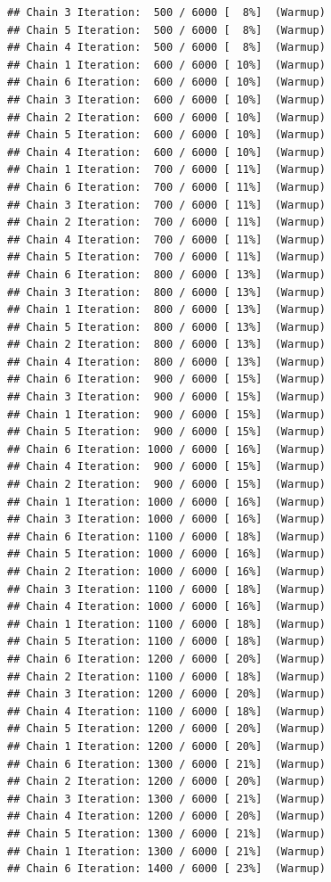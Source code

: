 \documentclass[
]{article}
\begin{document}
\begin{verbatim}
## Chain 3 Iteration:  500 / 6000 [  8%]  (Warmup) 
## Chain 5 Iteration:  500 / 6000 [  8%]  (Warmup) 
## Chain 4 Iteration:  500 / 6000 [  8%]  (Warmup) 
## Chain 1 Iteration:  600 / 6000 [ 10%]  (Warmup) 
## Chain 6 Iteration:  600 / 6000 [ 10%]  (Warmup) 
## Chain 3 Iteration:  600 / 6000 [ 10%]  (Warmup) 
## Chain 2 Iteration:  600 / 6000 [ 10%]  (Warmup) 
## Chain 5 Iteration:  600 / 6000 [ 10%]  (Warmup) 
## Chain 4 Iteration:  600 / 6000 [ 10%]  (Warmup) 
## Chain 1 Iteration:  700 / 6000 [ 11%]  (Warmup) 
## Chain 6 Iteration:  700 / 6000 [ 11%]  (Warmup) 
## Chain 3 Iteration:  700 / 6000 [ 11%]  (Warmup) 
## Chain 2 Iteration:  700 / 6000 [ 11%]  (Warmup) 
## Chain 4 Iteration:  700 / 6000 [ 11%]  (Warmup) 
## Chain 5 Iteration:  700 / 6000 [ 11%]  (Warmup) 
## Chain 6 Iteration:  800 / 6000 [ 13%]  (Warmup) 
## Chain 3 Iteration:  800 / 6000 [ 13%]  (Warmup) 
## Chain 1 Iteration:  800 / 6000 [ 13%]  (Warmup) 
## Chain 5 Iteration:  800 / 6000 [ 13%]  (Warmup) 
## Chain 2 Iteration:  800 / 6000 [ 13%]  (Warmup) 
## Chain 4 Iteration:  800 / 6000 [ 13%]  (Warmup) 
## Chain 6 Iteration:  900 / 6000 [ 15%]  (Warmup) 
## Chain 3 Iteration:  900 / 6000 [ 15%]  (Warmup) 
## Chain 1 Iteration:  900 / 6000 [ 15%]  (Warmup) 
## Chain 5 Iteration:  900 / 6000 [ 15%]  (Warmup) 
## Chain 6 Iteration: 1000 / 6000 [ 16%]  (Warmup) 
## Chain 4 Iteration:  900 / 6000 [ 15%]  (Warmup) 
## Chain 2 Iteration:  900 / 6000 [ 15%]  (Warmup) 
## Chain 1 Iteration: 1000 / 6000 [ 16%]  (Warmup) 
## Chain 3 Iteration: 1000 / 6000 [ 16%]  (Warmup) 
## Chain 6 Iteration: 1100 / 6000 [ 18%]  (Warmup) 
## Chain 5 Iteration: 1000 / 6000 [ 16%]  (Warmup) 
## Chain 2 Iteration: 1000 / 6000 [ 16%]  (Warmup) 
## Chain 3 Iteration: 1100 / 6000 [ 18%]  (Warmup) 
## Chain 4 Iteration: 1000 / 6000 [ 16%]  (Warmup) 
## Chain 1 Iteration: 1100 / 6000 [ 18%]  (Warmup) 
## Chain 5 Iteration: 1100 / 6000 [ 18%]  (Warmup) 
## Chain 6 Iteration: 1200 / 6000 [ 20%]  (Warmup) 
## Chain 2 Iteration: 1100 / 6000 [ 18%]  (Warmup) 
## Chain 3 Iteration: 1200 / 6000 [ 20%]  (Warmup) 
## Chain 4 Iteration: 1100 / 6000 [ 18%]  (Warmup) 
## Chain 5 Iteration: 1200 / 6000 [ 20%]  (Warmup) 
## Chain 1 Iteration: 1200 / 6000 [ 20%]  (Warmup) 
## Chain 6 Iteration: 1300 / 6000 [ 21%]  (Warmup) 
## Chain 2 Iteration: 1200 / 6000 [ 20%]  (Warmup) 
## Chain 3 Iteration: 1300 / 6000 [ 21%]  (Warmup) 
## Chain 4 Iteration: 1200 / 6000 [ 20%]  (Warmup) 
## Chain 5 Iteration: 1300 / 6000 [ 21%]  (Warmup) 
## Chain 1 Iteration: 1300 / 6000 [ 21%]  (Warmup) 
## Chain 6 Iteration: 1400 / 6000 [ 23%]  (Warmup) 

\end{verbatim}
\end{document}
